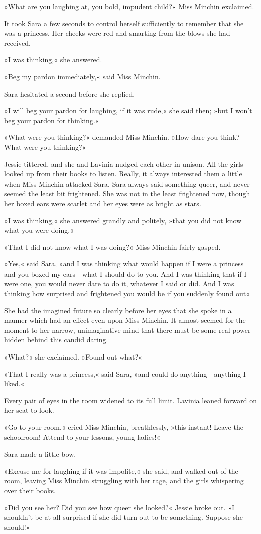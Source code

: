 »What are you laughing at, you bold, impudent child?« Miss Minchin exclaimed.

It took Sara a few seconds to control herself sufficiently to remember that she was a princess. Her cheeks were red and smarting from the blows she had received.

»I was thinking,« she answered.

»Beg my pardon immediately,« said Miss Minchin.

Sara hesitated a second before she replied.

»I will beg your pardon for laughing, if it was rude,« she said then; »but I won't beg your pardon for thinking.«

»What were you thinking?« demanded Miss Minchin. »How dare you think? What were you thinking?«

Jessie tittered, and she and Lavinia nudged each other in unison. All the girls looked up from their books to listen. Really, it always interested them a little when Miss Minchin attacked Sara. Sara always said something queer, and never seemed the least bit frightened. She was not in the least frightened now, though her boxed ears were scarlet and her eyes were as bright as stars.

»I was thinking,« she answered grandly and politely, »that you did not know what you were doing.«

»That I did not know what I was doing?« Miss Minchin fairly gasped.

»Yes,« said Sara, »and I was thinking what would happen if I were a princess and you boxed my ears—what I should do to you. And I was thinking that if I were one, you would never dare to do it, whatever I said or did. And I was thinking how surprised and frightened you would be if you suddenly found out\longdash«

She had the imagined future so clearly before her eyes that she spoke in a manner which had an effect even upon Miss Minchin. It almost seemed for the moment to her narrow, unimaginative mind that there must be some real power hidden behind this candid daring.

»What?« she exclaimed. »Found out what?«

»That I really was a princess,« said Sara, »and could do anything—anything I liked.«

Every pair of eyes in the room widened to its full limit. Lavinia leaned forward on her seat to look.

»Go to your room,« cried Miss Minchin, breathlessly, »this instant! Leave the schoolroom! Attend to your lessons, young ladies!«

Sara made a little bow.

»Excuse me for laughing if it was impolite,« she said, and walked out of the room, leaving Miss Minchin struggling with her rage, and the girls whispering over their books.

»Did you see her? Did you see how queer she looked?« Jessie broke out. »I shouldn't be at all surprised if she did turn out to be something. Suppose she should!«

